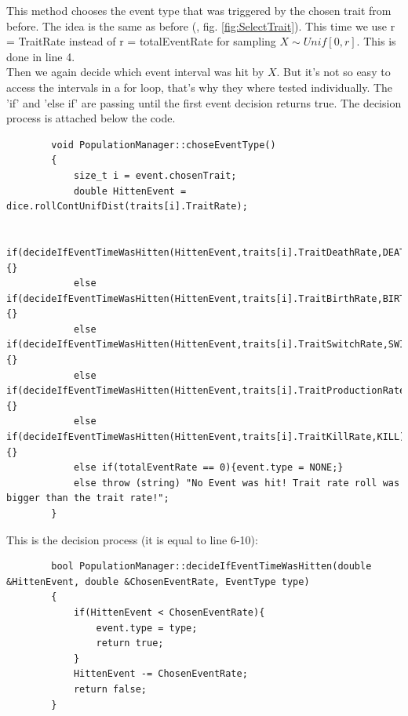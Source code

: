 \documentclass[a4paper,10pt]{scrartcl}
\begin{document}
		This method chooses the event type that was triggered by the chosen trait from before. The idea is the same as before (, fig. \ref{fig:SelectTrait}). This time we use r = TraitRate instead of r = totalEventRate for sampling $ X \sim Unif[0,r] $. This is done in line 4.\\
		Then we again decide which event interval was hit by $ X $. But it's not so easy to access the intervals in a for loop, that's why they where tested individually. The 'if' and 'else if' are passing until the first event decision returns true. The decision process is attached below the code.
		\begin{lstlisting} 
		void PopulationManager::choseEventType()
		{
		    size_t i = event.chosenTrait;
		    double HittenEvent = dice.rollContUnifDist(traits[i].TraitRate);
		
		    if(decideIfEventTimeWasHitten(HittenEvent,traits[i].TraitDeathRate,DEATH)){}
		    else if(decideIfEventTimeWasHitten(HittenEvent,traits[i].TraitBirthRate,BIRTH)){}
		    else if(decideIfEventTimeWasHitten(HittenEvent,traits[i].TraitSwitchRate,SWITCH)){}
		    else if(decideIfEventTimeWasHitten(HittenEvent,traits[i].TraitProductionRate,PRODUCTION)){}
		    else if(decideIfEventTimeWasHitten(HittenEvent,traits[i].TraitKillRate,KILL)){}
		    else if(totalEventRate == 0){event.type = NONE;}
		    else throw (string) "No Event was hit! Trait rate roll was bigger than the trait rate!";
		}
		\end{lstlisting}
		This is the decision process (it is equal to  line 6-10):
		\begin{lstlisting} 
		bool PopulationManager::decideIfEventTimeWasHitten(double &HittenEvent, double &ChosenEventRate, EventType type)
		{
		    if(HittenEvent < ChosenEventRate){
		        event.type = type;
		        return true;
		    }
		    HittenEvent -= ChosenEventRate;
		    return false;
		}
		\end{lstlisting}
		
\end{document}
